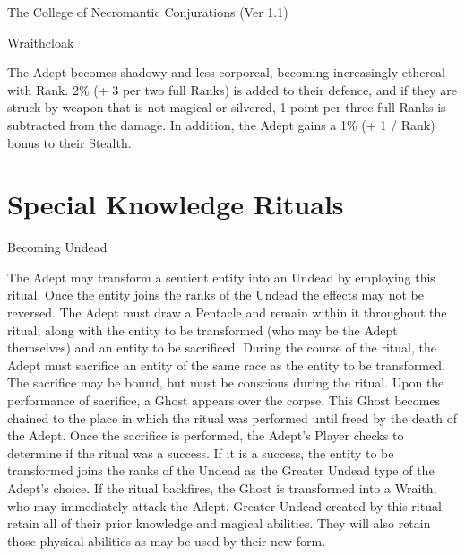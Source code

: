 \begin{Chapter}{The College of Necromantic Conjurations (Ver 1.1)}
\begin{spell}[S-16]{Wraithcloak}
\begin{effects}
The Adept becomes shadowy and less corporeal, becoming increasingly
ethereal with Rank. 2\% (+ 3 per two full Ranks) is added to their
defence, and if they are struck by weapon that is not magical or
silvered, 1 point per three full Ranks is subtracted from the damage.
In addition, the Adept gains a 1\% (+ 1 / Rank) bonus to their
Stealth.
\end{effects}
\end{spell}

\section{Special Knowledge Rituals}

\begin{ritual}[R-1]{Becoming Undead}

\begin{effects}
The Adept may transform a sentient entity into an Undead by employing
this ritual. Once the entity joins the ranks of the Undead the effects
may not be reversed.  The Adept must draw a Pentacle and remain within
it throughout the ritual, along with the entity to be transformed (who
may be the Adept themselves) and an entity to be sacrificed.  During
the course of the ritual, the Adept must sacrifice an entity of the
same race as the entity to be transformed.  The sacrifice may be
bound, but must be conscious during the ritual.  Upon the performance
of sacrifice, a Ghost appears over the corpse. This Ghost becomes
chained to the place in which the ritual was performed until freed by
the death of the Adept.  Once the sacrifice is performed, the Adept’s
Player checks to determine if the ritual was a success. If it is a
success, the entity to be transformed joins the ranks of the Undead as
the Greater Undead type of the Adept’s choice.  If the ritual
backfires, the Ghost is transformed into a Wraith, who may immediately
attack the Adept.  Greater Undead created by this ritual retain all of
their prior knowledge and magical abilities.  They will also retain
those physical abilities as may be used by their new form.
\end{effects}
\end{ritual}


\end{Chapter}
